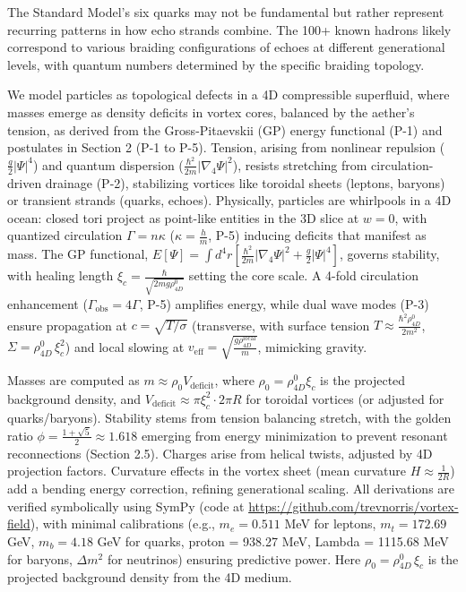 The Standard Model's six quarks may not be fundamental but rather represent recurring patterns in how echo strands combine. The 100+ known hadrons likely correspond to various braiding configurations of echoes at different generational levels, with quantum numbers determined by the specific braiding topology.

We model particles as topological defects in a 4D compressible superfluid, where masses emerge as density deficits in vortex cores, balanced by the aether's tension, as derived from the Gross-Pitaevskii (GP) energy functional (P-1) and postulates in Section 2 (P-1 to P-5). Tension, arising from nonlinear repulsion ($\frac{g}{2} |\Psi|^4$) and quantum dispersion ($\frac{\hbar^2}{2m} |\nabla_4 \Psi|^2$), resists stretching from circulation-driven drainage (P-2), stabilizing vortices like toroidal sheets (leptons, baryons) or transient strands (quarks, echoes). Physically, particles are whirlpools in a 4D ocean: closed tori project as point-like entities in the 3D slice at $w=0$, with quantized circulation $\Gamma = n \kappa$ ($\kappa = \frac{h}{m}$, P-5) inducing deficits that manifest as mass. The GP functional, $E[\Psi] = \int d^4 r \left[ \frac{\hbar^2}{2 m} |\nabla_4 \Psi|^2 + \frac{g}{2} |\Psi|^4 \right]$, governs stability, with healing length $\xi_c = \frac{\hbar}{\sqrt{2 m g \rho_{4D}^0}}$ setting the core scale. A 4-fold circulation enhancement ($\Gamma_{\text{obs}} = 4\Gamma$, P-5) amplifies energy, while dual wave modes (P-3) ensure propagation at $c = \sqrt{T / \sigma}$ (transverse, with surface tension $T \approx \frac{\hbar^2 \rho_{4D}^0}{2 m^2}$, $\Sigma = \rho_{4D}^0 \, \xi_c^2$) and local slowing at $v_{\text{eff}} = \sqrt{\frac{g \rho_{4D}^{\text{local}}}{m}}$, mimicking gravity.

Masses are computed as $m \approx \rho_0 V_{\text{deficit}}$, where $\rho_0 = \rho_{4D}^0 \xi_c$ is the projected background density, and $V_{\text{deficit}} \approx \pi \xi_c^2 \cdot 2\pi R$ for toroidal vortices (or adjusted for quarks/baryons). Stability stems from tension balancing stretch, with the golden ratio $\phi = \frac{1 + \sqrt{5}}{2} \approx 1.618$ emerging from energy minimization to prevent resonant reconnections (Section 2.5). Charges arise from helical twists, adjusted by 4D projection factors. Curvature effects in the vortex sheet (mean curvature $H \approx \frac{1}{2R}$) add a bending energy correction, refining generational scaling. All derivations are verified symbolically using SymPy (code at \url{https://github.com/trevnorris/vortex-field}), with minimal calibrations (e.g., $m_e = 0.511$ MeV for leptons, $m_t = 172.69$ GeV, $m_b = 4.18$ GeV for quarks, proton = 938.27 MeV, Lambda = 1115.68 MeV for baryons, $\Delta m^2$ for neutrinos) ensuring predictive power.
Here $\rho_0 = \rho_{4D}^0 \, \xi_c$ is the projected background density from the 4D medium.


